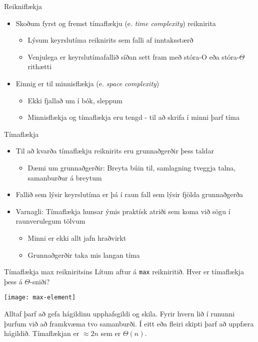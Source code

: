\documentclass[handout]{beamer}
\begin{document}
\begin{frame}{Reikniflækja}
\begin{itemize}
 \item Skoðum fyrst og fremst tímaflækju (e. \emph{time complexity}) reiknirita
 \begin{itemize}
  \item Lýsum keyrslutíma reiknirits sem falli af inntaksstærð
  \item Venjulega er keyrslutímafallið síðan sett fram með stóra-O eða stóra-$\Theta$ rithætti
 \end{itemize}
 \item Einnig er til minnisflækja (e. \emph{space complexity})
 \begin{itemize}
  \item Ekki fjallað um í bók, sleppum
  \item Minnisflækja og tímaflækja eru tengd - til að skrifa í minni þarf tíma
 \end{itemize}
\end{itemize}
\end{frame}

\begin{frame}{Tímaflækja}
\begin{itemize}
 \item Til að kvarða tímaflækju reiknirits eru grunnaðgerðir þess taldar
 \begin{itemize}
  \item Dæmi um grunnaðgerðir: Breyta búin til, samlagning tveggja talna, samanburður á breytum
 \end{itemize}
 \item Fallið sem lýsir keyrslutíma er þá í raun fall sem lýsir fjölda grunnaðgerða
 \item Varnagli: Tímaflækja hunsar ýmis praktísk atriði sem koma við sögu í raunverulegum tölvum
 \begin{itemize}
  \item Minni er ekki allt jafn hraðvirkt
  \item Grunnaðgerðir taka mis langan tíma
 \end{itemize}
\end{itemize}
\end{frame}

\begin{frame}{Tímaflækja max reikniritsins}
Lítum aftur á \texttt{max} reikniritið. Hver er tímaflækja þess á $\Theta$-sniði?

\texttt{[image: max-element]} \pause

Alltaf þarf að gefa hágildinu upphafsgildi og skila. Fyrir hvern lið í rununni þurfum við að framkvæma tvo samanburði. Í eitt eða fleiri skipti þarf að uppfæra hágildið. Tímaflækjan er $\approx 2n$ sem er $\Theta(n)$.
\end{frame}
\end{document}
